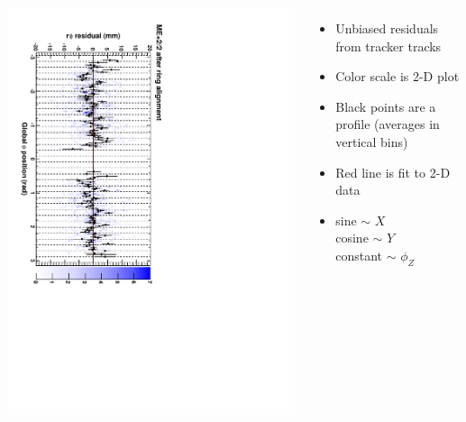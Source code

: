 \documentclass[compress]{beamer}
\begin{document}
\begin{frame}
\begin{columns}
\includegraphics[height=\linewidth, angle=90]{ringfits_after/mep22.pdf}
\begin{itemize}
\item Unbiased residuals from tracker tracks
\item Color scale is 2-D plot
\item Black points are a profile (averages in vertical bins)
\item Red line is fit to 2-D data
\item sine $\sim$ $X$ \\
cosine $\sim$ $Y$ \\
constant $\sim$ $\phi_Z$
\end{itemize}
\end{columns}
\end{frame}
\end{document}
